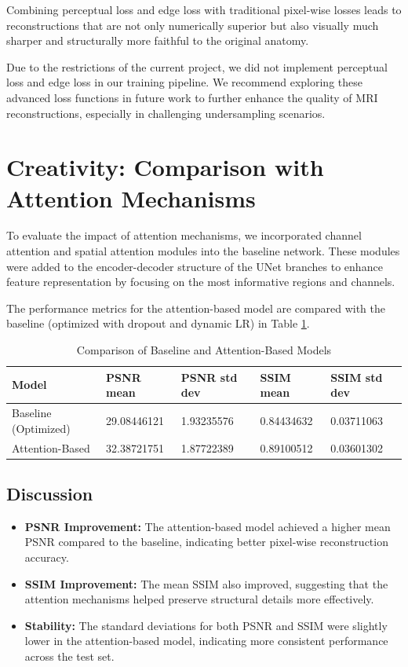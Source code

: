 \documentclass{article}
\begin{document}
Combining perceptual loss and edge loss with traditional pixel-wise losses leads to reconstructions that are not only numerically superior but also visually much sharper and structurally more faithful to the original anatomy.

Due to the restrictions of the current project, we did not implement perceptual loss and edge loss in our training pipeline. We recommend exploring these advanced loss functions in future work to further enhance the quality of MRI reconstructions, especially in challenging undersampling scenarios.

\section{Creativity: Comparison with Attention Mechanisms}

To evaluate the impact of attention mechanisms, we incorporated channel attention and spatial attention modules into the baseline network. These modules were added to the encoder-decoder structure of the UNet branches to enhance feature representation by focusing on the most informative regions and channels.

The performance metrics for the attention-based model are compared with the baseline (optimized with dropout and dynamic LR) in Table \ref{tab:attention_compare}.

\begin{table}[H]
  \caption{Comparison of Baseline and Attention-Based Models}
  \label{tab:attention_compare}
  \centering
  \begin{tabular}{lllll}
    \toprule
    Model               & PSNR mean   & PSNR std dev & SSIM mean  & SSIM std dev \\
    \midrule
    Baseline (Optimized) & 29.08446121 & 1.93235576   & 0.84434632 & 0.03711063   \\
    Attention-Based      & 32.38721751 & 1.87722389   & 0.89100512 & 0.03601302   \\
    \bottomrule
  \end{tabular}
\end{table}

\subsection{Discussion}
\begin{itemize}
  \item \textbf{PSNR Improvement:} The attention-based model achieved a higher mean PSNR compared to the baseline, indicating better pixel-wise reconstruction accuracy.
  \item \textbf{SSIM Improvement:} The mean SSIM also improved, suggesting that the attention mechanisms helped preserve structural details more effectively.
  \item \textbf{Stability:} The standard deviations for both PSNR and SSIM were slightly lower in the attention-based model, indicating more consistent performance across the test set.
\end{itemize}
\end{document}
